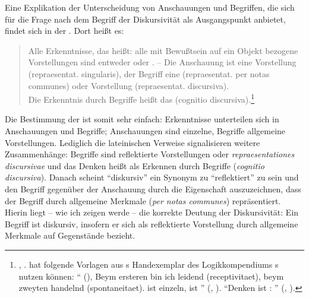 Eine Explikation der Unterscheidung von Anschauungen und Begriffen, die sich für
die Frage nach dem Begriff der Diskursivität als Ausgangspunkt anbietet, findet
sich in der {\jaeschelogik}. Dort heißt es:
\begin{quote}
Alle Erkenntnisse, das heißt: alle mit Bewußtsein auf ein Objekt bezogene
Vorstellungen sind entweder  oder . -- Die
Anschauung ist eine  Vorstellung (repraesentat. singularis), der
Begriff eine  (repraesentat. per notas communes) oder
 Vorstellung (repraesentat. discursiva).\\ Die Erkenntnis
durch Begriffe heißt das  (cognitio
discursiva).\footnote{\cite[][\S~1]{Kant:ImmanuelKantsLogik1977}, \cite[][IX:
91.6--11]{Kant:GesammelteWerke1900ff.}.  hat
folgende Vorlagen aus s Handexemplar des Logikkompendiums
s nutzen können:
\enquote{ (), Beym ersteren bin ich leidend (receptivitaet), beym zweyten
handelnd (spontaneitaet).  ist einzeln,  ist
}
\mkbibparens{\cite[][]{Kant:Reflexionen1900ff.}, \cite[][XVI:
538.22--25]{Kant:GesammelteWerke1900ff.}}. \enquote{Denken ist
: }
\mkbibparens{\cite[][]{Kant:Reflexionen1900ff.},
\cite[][XVI: 541.5]{Kant:GesammelteWerke1900ff.}}.}
\end{quote}
Die Bestimmung der {\jaeschelogik} ist somit sehr einfach:
Erkenntnisse unterteilen sich in Anschauungen und Begriffe;
Anschauungen sind einzelne, Begriffe allgemeine
Vorstellungen. Lediglich die lateinischen Verweise signalisieren
weitere Zusammenhänge: Begriffe sind reflektierte Vorstellungen oder
\emph{repraesentationes discursivae} und das Denken heißt als Erkennen durch Begriffe
 (\emph{cognitio discursiva}). Danach scheint
\enquote{diskursiv} ein Synonym zu \enquote{reflektiert} zu sein und den Begriff
gegenüber der Anschauung durch die Eigenschaft auszuzeichnen, dass der Begriff
durch allgemeine Merkmale (\emph{per notas communes}) repräsentiert.
Hierin liegt -- wie ich zeigen werde -- die korrekte Deutung der Diskursivität:
Ein Begriff ist diskursiv, insofern er sich als reflektierte Vorstellung durch
allgemeine Merkmale auf Gegenstände bezieht.

